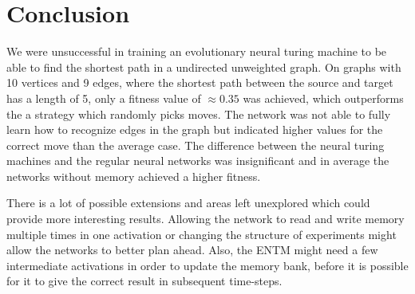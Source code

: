 
\section{Conclusion}
We were unsuccessful in training an evolutionary neural turing machine to be able to find the shortest path in a undirected unweighted graph. On graphs with 10 vertices and 9 edges, where the shortest path between the source and target has a length of 5, only a fitness value of $\approx0.35 $ was achieved, which outperforms the a strategy which randomly picks moves. The network was not able to fully learn how to recognize edges in the graph but indicated higher values for the correct move than the average case. 
The difference between the neural turing machines and the regular neural networks was insignificant and in average the networks without memory achieved a higher fitness. 

\newpar There is a lot of possible extensions and areas left unexplored which could provide more interesting results. Allowing the network to read and write memory multiple times in one activation or changing the structure of experiments might allow the networks to better plan ahead. Also, the ENTM might need a few intermediate activations in order to update the memory bank, before it is possible for it to give the correct result in subsequent time-steps.